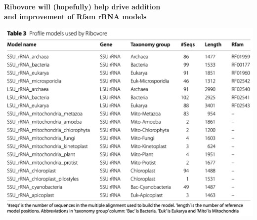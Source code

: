 \documentclass[landscape]{slides}
\begin{document}
\begin{slide}
\begin{center}
\textbf{Ribovore will (hopefully) help drive addition \\ and improvement of
  Rfam rRNA models}

\includegraphics[width=9in]{figs/ribovore-table3}
\end{center}

\vfill
\end{slide}
\end{document}
